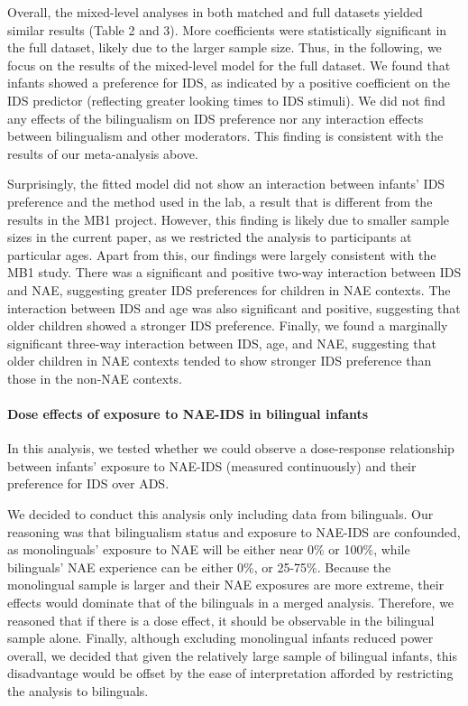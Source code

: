 \documentclass[,man,floatsintext]{apa6}
\let\oldparagraph\paragraph
\renewcommand{\paragraph}[1]{\oldparagraph{#1}\mbox{}}
\begin{document}
Overall, the mixed-level analyses in both matched and full datasets yielded similar results (Table 2 and 3). More coefficients were statistically significant in the full dataset, likely due to the larger sample size. Thus, in the following, we focus on the results of the mixed-level model for the full dataset. We found that infants showed a preference for IDS, as indicated by a positive coefficient on the IDS predictor (reflecting greater looking times to IDS stimuli). We did not find any effects of the bilingualism on IDS preference nor any interaction effects between bilingualism and other moderators. This finding is consistent with the results of our meta-analysis above.

Surprisingly, the fitted model did not show an interaction between infants' IDS preference and the method used in the lab, a result that is different from the results in the MB1 project. However, this finding is likely due to smaller sample sizes in the current paper, as we restricted the analysis to participants at particular ages. Apart from this, our findings were largely consistent with the MB1 study. There was a significant and positive two-way interaction between IDS and NAE, suggesting greater IDS preferences for children in NAE contexts. The interaction between IDS and age was also significant and positive, suggesting that older children showed a stronger IDS preference. Finally, we found a marginally significant three-way interaction between IDS, age, and NAE, suggesting that older children in NAE contexts tended to show stronger IDS preference than those in the non-NAE contexts.

\hypertarget{dose-effects-of-exposure-to-nae-ids-in-bilingual-infants}{%
\paragraph{Dose effects of exposure to NAE-IDS in bilingual infants}\label{dose-effects-of-exposure-to-nae-ids-in-bilingual-infants}}

In this analysis, we tested whether we could observe a dose-response relationship between infants' exposure to NAE-IDS (measured continuously) and their preference for IDS over ADS.

We decided to conduct this analysis only including data from bilinguals. Our reasoning was that bilingualism status and exposure to NAE-IDS are confounded, as monolinguals' exposure to NAE will be either near 0\% or 100\%, while bilinguals' NAE experience can be either 0\%, or 25-75\%. Because the monolingual sample is larger and their NAE exposures are more extreme, their effects would dominate that of the bilinguals in a merged analysis. Therefore, we reasoned that if there is a dose effect, it should be observable in the bilingual sample alone. Finally, although excluding monolingual infants reduced power overall, we decided that given the relatively large sample of bilingual infants, this disadvantage would be offset by the ease of interpretation afforded by restricting the analysis to bilinguals.
\end{document}
